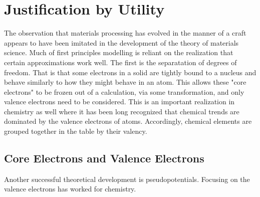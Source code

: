\section{Justification by Utility}
The observation that materials processing has evolved in the manner 
of a craft appears to have been imitated in the development of the 
theory of materials science. Much of first principles modelling is reliant on
the realization that certain approximations work well. The first is 
the separatation of degrees of freedom. That is that some electrons in a solid are
tightly bound to a nucleus and behave similarly to how they might behave in an atom.
This allows these "core electrons" to be frozen out of a calculation, 
via some transformation, and only valence electrons need to be considered. 
This is an important realization in chemistry as well where it has 
been long recognized that chemical trends are dominated by
the valence electrons of atoms. Accordingly, chemical elements are 
grouped together in the table by their valency. 

\subsection{Core Electrons and Valence Electrons}
Another successful theoretical development is pseudopotentials. Focusing on the valence electrons 
has worked for chemistry.

